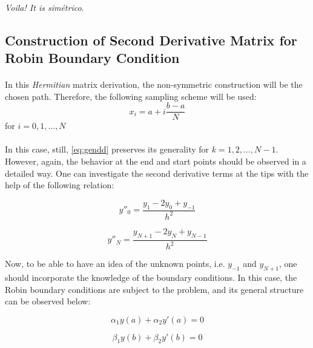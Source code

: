 \documentclass[letterpaper,12pt]{article}
\begin{document}
\paragraph{} \textit{Voila! It is simétrico.}

\subsection{Construction of Second Derivative Matrix for Robin Boundary Condition}

\paragraph{} In this \textit{Hermitian} matrix derivation, the non-symmetric construction will be the chosen path. Therefore, the following sampling scheme will be used:
\begin{equation*}
    x_i = a + i\frac{b-a}{N}
\end{equation*}
for $i = 0, 1, \dots, N$

\paragraph{} In this case, still, \eqref{eq:gendd} preserves its generality for $k = 1, 2, \dots, N-1$. However, again, the behavior at the end and start points should be observed in a detailed way. One can investigate the second derivative terms at the tips with the help of the following relation:

\begin{equation}
    \label{eq:y0dd1}
    y''_0 = \frac{y_1 -2y_0+y_{-1}}{h^2}
\end{equation}

\begin{equation}
    \label{eq:yNdd1}
    y''_{N} = \frac{y_{N+1} -2y_{N}+y_{N-1}}{h^2}
\end{equation}

Now, to be able to have an idea of the unknown points, i.e. $y_{-1}$ and $y_{N+1}$, one should incorporate the knowledge of the boundary conditions. In this case, the Robin boundary conditions are subject to the problem, and its general structure can be observed below:

\begin{equation*}
    \alpha_1 y(a) + \alpha_2 y'(a) = 0 
\end{equation*}

\begin{equation*}
    \beta_1 y(b) + \beta_2 y'(b) = 0
\end{equation*}
\end{document}

